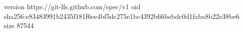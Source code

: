 version https://git-lfs.github.com/spec/v1
oid sha256:e83483991b2435f181f6ee4bf5dc275e1bc4392b66bebdc0d1faba8b22e38be6
size 87544
